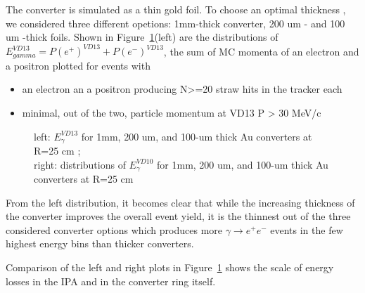 The converter is simulated as a thin gold foil. To choose an optimal thickness ,
we considered three different opetions: 1mm-thick converter, 200 um - and 100 um -thick foils.
Shown in Figure~\ref{figure:sum_mom_vd13}(left) are the distributions of $E_{gamma}^{VD13} = P(e^+)^{VD13} + P(e^-)^{VD13}$,
the sum of MC momenta of an electron and a positron plotted for events with

\begin{itemize}
\item
  an electron an a positron producing N>=20 straw hits in the tracker each
\item
  minimal, out of the two, particle momentum at VD13 P > 30 MeV/c
\end{itemize}

\begin{figure}[H]
  \caption{
    \label{figure:sum_mom_vd13}
    left: $E_\gamma^{VD13}$ for 1mm, 200 um, and 100-um thick Au converters at R=25 cm ; \\
    right: distributions of $E_\gamma^{VD10}$ for 1mm, 200 um, and 100-um thick Au converters at R=25 cm
  }
\end{figure}

From the left distribution, it becomes clear that while the increasing thickness of the converter improves the
overall event yield, it is the thinnest out of the three considered converter options which produces
more $\gamma \to e^+e^-$ events in the few highest energy bins than thicker converters.

Comparison of the left and right plots in Figure~\ref{figure:sum_mom_vd13} shows the scale of energy
losses in the IPA and in the converter ring itself.

